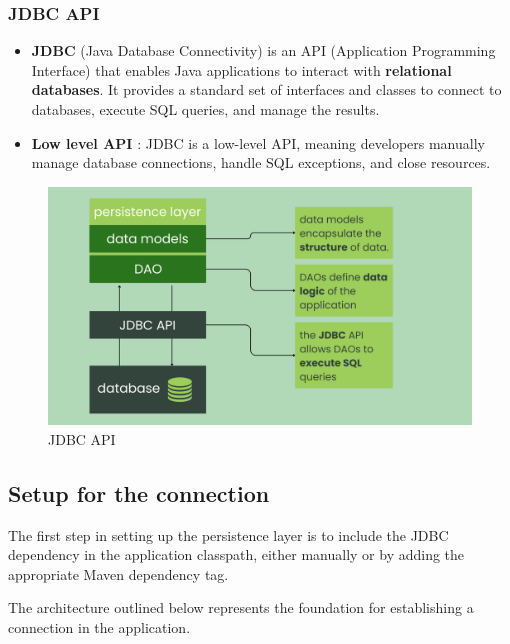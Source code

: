 \documentclass{article}
\begin{document}
\subsubsection{JDBC API}

\begin{itemize}
    \item \textbf{JDBC} (Java Database Connectivity) is an API (Application Programming Interface) that enables Java applications to interact with \textbf{relational databases}. It provides a standard set of interfaces and classes to connect to databases, execute SQL queries, and manage the results.

    \item \textbf{Low level API} : JDBC is a low-level API, meaning developers manually manage database connections, handle SQL exceptions, and close resources.

\end{itemize}

\begin{figure}[H]
    \centering
    \begin{framed}
        \includegraphics[width=0.8\linewidth]{images/persistence_jdbc.png}
    \end{framed}
    \caption{JDBC API}
    \label{fig:spring-logo}
\end{figure}

\subsection{Setup for the connection}

The first step in setting up the persistence layer is to include the JDBC dependency in the application classpath, either manually or by adding the appropriate Maven dependency tag. 

The architecture outlined below represents the foundation for establishing a connection in the application.
\end{document}
